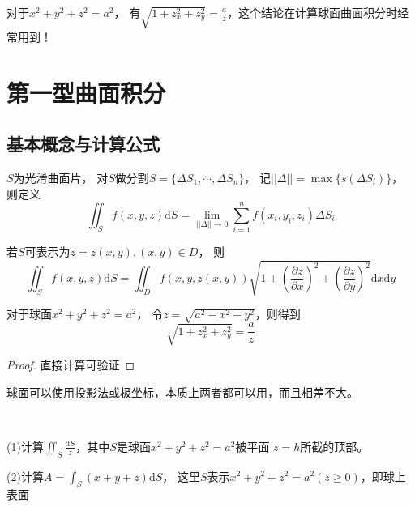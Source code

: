 \begin{note}
  对于$x^2 + y^2 + z^2 = a^2$，
  有$\sqrt{1 + z_x^2 + z_y^2} = \frac{a}{z}$，这个结论在计算球面曲面积分时经常用到！
\end{note}

\section{第一型曲面积分}

\subsection{基本概念与计算公式}

\begin{definition}[第一型曲面积分]
  $S$为光滑曲面片，
  对$S$做分割$S = \{\Delta S_1,\cdots,\Delta S_n\}$，
  记$||\Delta|| = \max \{s(\Delta S_i)\}$，
  则定义
  \begin{equation*}
    \iint _S f(x,y,z) \mathrm{d}S = \lim \limits _{||\Delta|| \rightarrow 0}\sum\limits_{i = 1}^n f(x_i,y_i,z_i)\Delta S_i
  \end{equation*}
\end{definition}


\begin{theorem}[投影法]
  若$S$可表示为$z = z(x,y), (x,y) \in D$，
  则
  \begin{equation*}
    \iint _S f(x,y,z) \mathrm{d}S = \iint _D f(x,y,z(x,y))\sqrt{1 + (\frac{\partial z}{\partial x})^2 + (\frac{\partial z}{\partial y})^2 }\mathrm{d}x\mathrm{d}y
  \end{equation*}
\end{theorem}

\begin{theorem}[球坐标变换结论]
  对于球面$x^2 + y^2 + z^2 = a^2$，
  令$z = \sqrt{a^2 - x^2 - y^2}$，则得到
  \begin{equation*}
    \sqrt{1 + z_x^2 + z_y^2} = \frac{a}{z}
  \end{equation*}
\end{theorem}

\begin{proof}
  直接计算可验证
\end{proof}

\begin{note}
  球面可以使用投影法或极坐标，本质上两者都可以用，而且相差不大。
\end{note}

~

\begin{exercise}[投影法]
  (1)计算$\iint_S \frac{\mathrm{d} S}{z}$，其中$S$是球面$x^2 + y^2 + z^2 = a^2$被平面
  $z = h$所截的顶部。
  
  (2)计算$A = \int _S(x + y + z)\mathrm{d}S$，
  这里$S$表示$x^2 + y^2 + z^2 = a^2(z \geq 0)$，即球上表面
\end{exercise}

